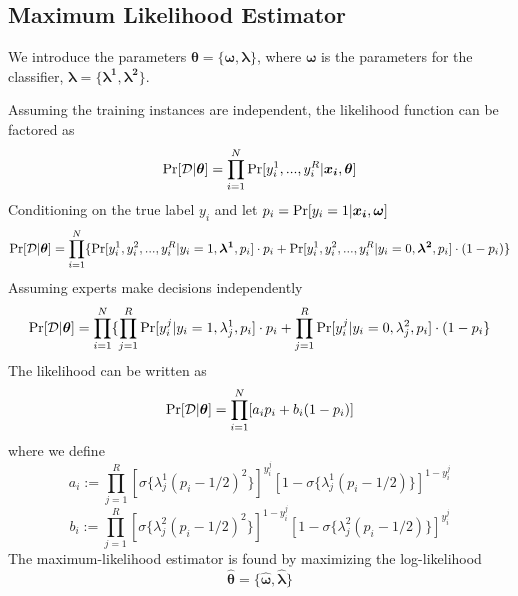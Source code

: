 \documentclass{article}
\begin{document}
\subsection{Maximum Likelihood Estimator}
We introduce the parameters $\bm{\theta}=\lbrace \bm{\omega,\lambda}\rbrace$, where $\bm{\omega}$ is the parameters for the classifier, $\bm{\lambda=\lbrace\lambda^{1},\lambda^{2}}\rbrace$.

Assuming the training instances are independent, the likelihood function can be factored as $$\textup{Pr}[\mathcal{D}|\bm{\theta}]=\prod_{i=1}^{N}\textup{Pr}[y_i^1,...,y_i^R|\bm{x_i},\bm{\theta}]$$
Conditioning on the true label $y_i$ and let $p_i=\textup{Pr}[y_i=1|\bm{x_i},\bm{\omega}]$
$$\textup{Pr}[\mathcal{D}|\bm{\theta}]=\prod_{i=1}^{N}\lbrace \textup{Pr}[y_i^1, y_i^2,...,y_i^R|y_i=1,\bm{\lambda^1},p_i]\cdot p_i+ \textup{Pr}[y_i^1,y_i^2,...,y_i^R|y_i=0,\bm{\lambda^2},p_i]\cdot (1-p_i) \rbrace$$
Assuming experts make decisions independently
$$\textup{Pr}[\mathcal{D}|\bm{\theta}]=\prod_{i=1}^{N} \lbrace \prod_{j=1}^{R} \textup{Pr}[y_i^j|y_i=1,\lambda_j^1,p_i]\cdot p_i+\prod_{j=1}^{R}\textup{Pr}[y_i^j|y_i=0,\lambda_j^2,p_i]\cdot (1-p_i \}$$
The likelihood can be written as
$$\textup{Pr}[\mathcal{D}|\bm{\theta}]=\prod_{i=1}^{N}[a_i p_i+b_i (1-p_i)]$$
where we define
$$a_i:=\prod_{j=1}^R[\sigma\{ \lambda_j^1(p_i-1/2)^2 \}]^{y_i^j} [1-\sigma\{ \lambda_j^1 (p_i-1/2) \}]^{1-y_i^j} $$
$$b_i:=\prod_{j=1}^R[\sigma\{ \lambda_j^2(p_i-1/2)^2 \}]^{1-y_i^j} [1-\sigma\{ \lambda_j^2 (p_i-1/2) \}]^{y_i^j} $$
The maximum-likelihood estimator is found by maximizing the log-likelihood
$$\hat{\bm{\theta}}=\lbrace \bm{\hat{\omega},\hat{\lambda}}\}$$
\end{document}
